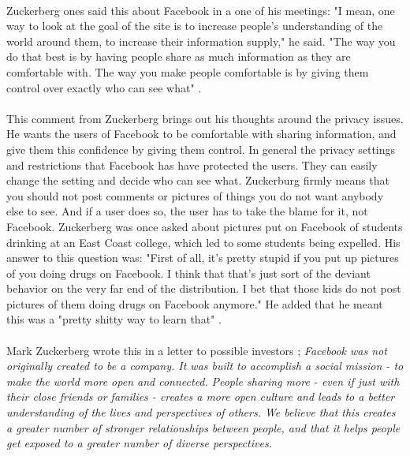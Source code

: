 \paragraph{}
Zuckerberg ones said this about Facebook in a one of his meetings: "I mean, one way to look at the goal of the site is to increase people’s understanding of the world around them, to increase their information supply," he said. "The way you do that best is by having people share as much information as they are comfortable with. The way you make people comfortable is by giving them control over exactly who can see what" \cite{MeMedia}.

\paragraph{}
This comment from Zuckerberg brings out his thoughts around the privacy issues. He wants the users of Facebook to be comfortable with sharing information, and give them this confidence by giving them control. In general the privacy settings and restrictions that Facebook has have protected the users. They can easily change the setting and decide who can see what. Zuckerburg firmly means that you should not post comments or pictures of things you do not want anybody else to see. And if a user does so, the user has to take the blame for it, not Facebook. Zuckerberg was once asked about pictures put on Facebook of students drinking at an East Coast college, which led to some students being expelled. His answer to this question was: "First of all, it's pretty stupid if you put up pictures of you doing drugs on Facebook. I think that that's just sort of the deviant behavior on the very far end of the distribution. I bet that those kids do not post pictures of them doing drugs on Facebook anymore." He added that he meant this was a "pretty shitty way to learn that" \cite{MeMedia}.

\paragraph{}
Mark Zuckerberg wrote this in a letter to possible investors \cite{LetterToInvestors}; \textit{Facebook was not originally created to be a company. It was built to accomplish a social mission - to make the world more open and connected.} \textit{People sharing more - even if just with their close friends or families - creates a more open culture and leads to a better understanding of the lives and perspectives of others. We believe that this creates a greater number of stronger relationships between people, and that it helps people get exposed to a greater number of diverse perspectives.}
